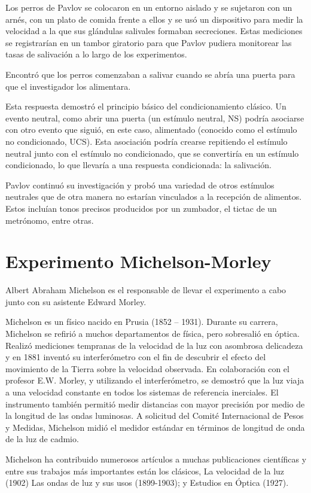 \documentclass[letterpaper, 10pt, journal]{IEEEtran}
\begin{document}
Los perros de Pavlov se colocaron en un entorno aislado y se sujetaron con un arnés, con un plato de comida frente a ellos y se usó un dispositivo para medir la velocidad a la que sus glándulas salivales formaban secreciones. Estas mediciones se registrarían en un tambor giratorio para que Pavlov pudiera monitorear las tasas de salivación a lo largo de los experimentos.

Encontró que los perros comenzaban a salivar cuando se abría una puerta para que el investigador los alimentara.

Esta respuesta demostró el principio básico del condicionamiento clásico. Un evento neutral, como abrir una puerta (un estímulo neutral, NS) podría asociarse con otro evento que siguió, en este caso, alimentado (conocido como el estímulo no condicionado, UCS). Esta asociación podría crearse repitiendo el estímulo neutral junto con el estímulo no condicionado, que se convertiría en un estímulo condicionado, lo que llevaría a una respuesta condicionada: la salivación.

Pavlov continuó su investigación y probó una variedad de otros estímulos neutrales que de otra manera no estarían vinculados a la recepción de alimentos. Estos incluían tonos precisos producidos por un zumbador, el tictac de un metrónomo, entre otras.

\section{Experimento Michelson-Morley}
Albert Abraham Michelson es el responsable de llevar el experimento a cabo junto con su asistente Edward Morley.

Michelson es un físico nacido en Prusia (1852 – 1931). Durante su carrera, Michelson se refirió a muchos departamentos de física, pero sobresalió en óptica. Realizó mediciones tempranas de la velocidad de la luz con asombrosa delicadeza y en 1881 inventó su interferómetro con el fin de descubrir el efecto del movimiento de la Tierra sobre la velocidad observada. En colaboración con el profesor E.W. Morley, y utilizando el interferómetro, se demostró que la luz viaja a una velocidad constante en todos los sistemas de referencia inerciales. El instrumento también permitió medir distancias con mayor precisión por medio de la longitud de las ondas luminosas. A solicitud del Comité Internacional de Pesos y Medidas, Michelson midió el medidor estándar en términos de longitud de onda de la luz de cadmio. 

Michelson ha contribuido numerosos artículos a muchas publicaciones científicas y entre sus trabajos más importantes están los clásicos, La velocidad de la luz (1902) Las ondas de luz y sus usos (1899-1903); y Estudios en Óptica (1927).
\end{document}
